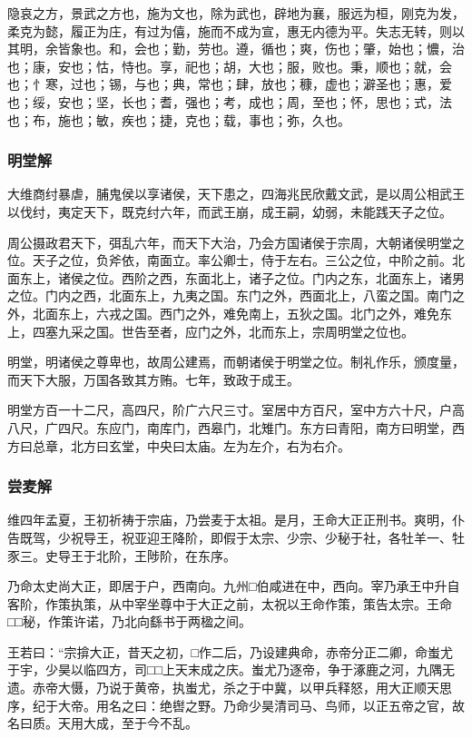 \documentclass[]{article}
\begin{document}
隐哀之方，景武之方也，施为文也，除为武也，辟地为襄，服远为桓，刚克为发，柔克为懿，履正为庄，有过为僖，施而不成为宣，惠无内德为平。失志无转，则以其明，余皆象也。和，会也；勤，劳也。遵，循也；爽，伤也；肇，始也；憹，治也；康，安也；怙，恃也。享，祀也；胡，大也；服，败也。秉，顺也；就，会也；忄寒，过也；锡，与也；典，常也；肆，放也；穅，虚也；澼圣也；惠，爱也；绥，安也；坚，长也；耆，强也；考，成也；周，至也；怀，思也；式，法也；布，施也；敏，疾也；捷，克也；载，事也；弥，久也。

\hypertarget{header-n291}{%
\subsubsection{明堂解}\label{header-n291}}

大维商纣暴虐，脯鬼侯以享诸侯，天下患之，四海兆民欣戴文武，是以周公相武王以伐纣，夷定天下，既克纣六年，而武王崩，成王嗣，幼弱，未能践天子之位。

周公摄政君天下，弭乱六年，而天下大治，乃会方国诸侯于宗周，大朝诸侯明堂之位。天子之位，负斧依，南面立。率公卿士，侍于左右。三公之位，中阶之前。北面东上，诸侯之位。西阶之西，东面北上，诸子之位。门内之东，北面东上，诸男之位。门内之西，北面东上，九夷之国。东门之外，西面北上，八蛮之国。南门之外，北面东上，六戎之国。西门之外，难免南上，五狄之国。北门之外，难免东上，四塞九采之国。世告至者，应门之外，北而东上，宗周明堂之位也。

明堂，明诸侯之尊卑也，故周公建焉，而朝诸侯于明堂之位。制礼作乐，颁度量，而天下大服，万国各致其方贿。七年，致政于成王。

明堂方百一十二尺，高四尺，阶广六尺三寸。室居中方百尺，室中方六十尺，户高八尺，广四尺。东应门，南库门，西皋门，北雉门。东方曰青阳，南方曰明堂，西方曰总章，北方曰玄堂，中央曰太庙。左为左介，右为右介。

\hypertarget{header-n295}{%
\subsubsection{尝麦解}\label{header-n295}}

维四年孟夏，王初祈祷于宗庙，乃尝麦于太祖。是月，王命大正正刑书。爽明，仆告既驾，少祝导王，祝亚迎王降阶，即假于太宗、少宗、少秘于社，各牡羊一、牡豕三。史导王于北阶，王陟阶，在东序。

乃命太史尚大正，即居于户，西南向。九州□伯咸进在中，西向。宰乃承王中升自客阶，作策执策，从中宰坐尊中于大正之前，太祝以王命作策，策告太宗。王命□□秘，作策许诺，乃北向繇书于两楹之间。

王若曰：``宗揜大正，昔天之初，□作二后，乃设建典命，赤帝分正二卿，命蚩尤于宇，少昊以临四方，司□□上天末成之庆。蚩尤乃逐帝，争于涿鹿之河，九隅无遗。赤帝大慑，乃说于黄帝，执蚩尤，杀之于中冀，以甲兵释怒，用大正顺天思序，纪于大帝。用名之曰：绝辔之野。乃命少昊清司马、鸟师，以正五帝之官，故名曰质。天用大成，至于今不乱。
\end{document}

